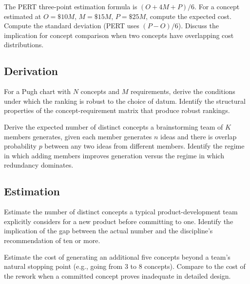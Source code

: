 \begin{exercise}
The PERT three-point estimation formula is $(O + 4M + P)/6$. For a concept estimated at $O = \$10M$, $M = \$15M$, $P = \$25M$, compute the expected cost. Compute the standard deviation (PERT uses $(P-O)/6$). Discuss the implication for concept comparison when two concepts have overlapping cost distributions.
\end{exercise}

\subsection*{Derivation}

\begin{exercise}
For a Pugh chart with $N$ concepts and $M$ requirements, derive the conditions under which the ranking is robust to the choice of datum. Identify the structural properties of the concept-requirement matrix that produce robust rankings.
\end{exercise}

\begin{exercise}
Derive the expected number of distinct concepts a brainstorming team of $K$ members generates, given each member generates $n$ ideas and there is overlap probability $p$ between any two ideas from different members. Identify the regime in which adding members improves generation versus the regime in which redundancy dominates.
\end{exercise}

\subsection*{Estimation}

\begin{exercise}
Estimate the number of distinct concepts a typical product-development team explicitly considers for a new product before committing to one. Identify the implication of the gap between the actual number and the discipline's recommendation of ten or more.
\end{exercise}

\begin{exercise}
Estimate the cost of generating an additional five concepts beyond a team's natural stopping point (e.g., going from 3 to 8 concepts). Compare to the cost of the rework when a committed concept proves inadequate in detailed design.
\end{exercise}

